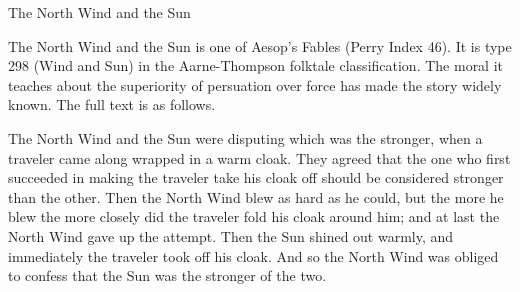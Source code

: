 \vskip 1cm
\centerline{The North Wind and the Sun}
\vskip 6pt

The North Wind and the Sun is one of Aesop's Fables (Perry Index 46).
It is type 298 (Wind and Sun) in the Aarne-Thompson folktale classification.
The moral it teaches about the superiority of persuation over force has made the story widely known. The full text is as follows.

The North Wind and the Sun were disputing which was the stronger, when a traveler came along wrapped in a warm cloak.
They agreed that the one who first succeeded in making the traveler take his cloak off should be considered stronger than the other.
Then the North Wind blew as hard as he could, but the more he blew the more closely did the traveler fold his cloak around him;
and at last the North Wind gave up the attempt. Then the Sun shined out warmly, and immediately the traveler took off his cloak.
And so the North Wind was obliged to confess that the Sun was the stronger of the two.

\bye
